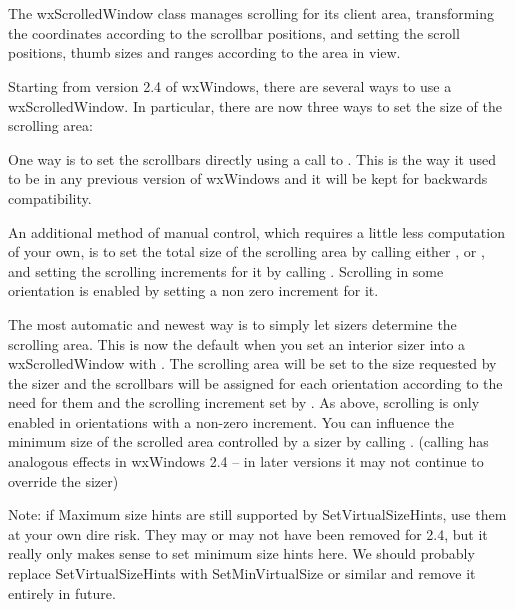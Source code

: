 \section{}\label{wxscrolledwindow}

The wxScrolledWindow class manages scrolling for its client area, transforming
the coordinates according to the scrollbar positions, and setting the
scroll positions, thumb sizes and ranges according to the area in view.

Starting from version 2.4 of wxWindows, there are several ways to use a
wxScrolledWindow. In particular, there are now three ways to set the
size of the scrolling area:

One way is to set the scrollbars directly using a call to
.
This is the way it used to be in any previous version of wxWindows
and it will be kept for backwards compatibility.

An additional method of manual control, which requires a little less
computation of your own, is to set the total size of the scrolling area by
calling either ,
or , and setting the
scrolling increments for it by calling
.
Scrolling in some orientation is enabled by setting a non zero increment
for it.

The most automatic and newest way is to simply let sizers determine the
scrolling area. This is now the default when you set an interior sizer
into a wxScrolledWindow with .
The scrolling area will be set to the size requested by the sizer and
the scrollbars will be assigned for each orientation according to the need
for them and the scrolling increment set by 
.
As above, scrolling is only enabled in orientations with a non-zero
increment.  You can influence the minimum size of the scrolled area
controlled by a sizer by calling
.
(calling 
 has analogous effects in wxWindows 2.4 -- in later versions it may not continue
 to override the sizer)

Note:  if Maximum size hints are still supported by SetVirtualSizeHints, use
them at your own dire risk.  They may or may not have been removed for 2.4,
but it really only makes sense to set minimum size hints here.  We should
probably replace SetVirtualSizeHints with SetMinVirtualSize or similar
and remove it entirely in future.

